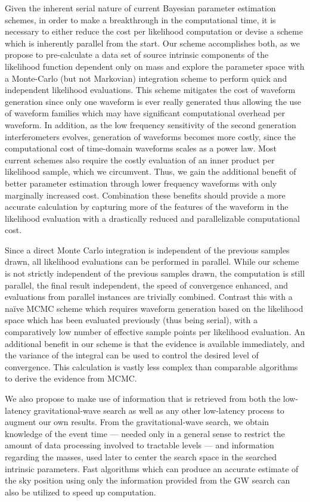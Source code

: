 Given the inherent serial nature of current Bayesian parameter estimation schemes, in order to make a breakthrough in the computational time, it is necessary to either reduce the cost per likelihood computation or devise a scheme which is inherently parallel from the start. Our scheme accomplishes both, as we propose to pre-calculate a data set of source intrinsic components of the likelihood function dependent only on mass and explore the parameter space with a Monte-Carlo (but not Markovian) integration scheme to perform quick and independent likelihood evaluations. This scheme mitigates the cost of waveform generation since only one waveform is ever really generated thus allowing the use of waveform families which may have significant computational overhead per waveform. In addition, as the low frequency sensitivity of the second generation interferometers evolves, generation of waveforms becomes more costly, since the computational cost of time-domain waveforms scales as a power law. Most current schemes also require the costly evaluation of an inner product per likelihood sample, which we circumvent. Thus, we gain the additional benefit of better parameter estimation through lower frequency waveforms with only marginally increased cost. Combination these benefits should provide a more accurate calculation by capturing more of the features of the waveform in the likelihood evaluation with a drastically reduced and parallelizable computational cost.

Since a direct Monte Carlo integration is independent of the previous samples drawn, all likelihood evaluations can be performed in parallel. While our scheme is not strictly independent of the previous samples drawn, the computation is still parallel, the final result independent, the speed of convergence enhanced, and evaluations from parallel instances are trivially combined. Contrast this with a na\"ive MCMC scheme which requires waveform generation based on the likelihood space which has been evaluated previously (thus being serial), with a comparatively low number of effective sample points per likelihood evaluation. An additional benefit in our scheme is that the evidence is available immediately, and the variance of the integral can be used to control the desired level of convergence. This calculation is vastly less complex than comparable algorithms to derive the evidence from MCMC\cite{thermoint}.

We also propose to make use of information that is retrieved from both the low-latency gravitational-wave search as well as any other low-latency process to augment our own results. From the gravitational-wave search, we obtain knowledge of the event time --- needed only in a general sense to restrict the amount of data processing involved to tractable levels --- and information regarding the masses, used later to center the search space in the searched intrinsic parameters. Fast algorithms which can produce an accurate estimate of the sky position using only the information provided from the GW search\cite{bayestar} can also be utilized to speed up computation.

